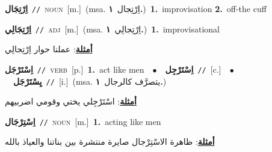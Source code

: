 \documentclass[10pt,a4paper,twoside]{article} %
\begin{document}
\begin{multicols}{2}
{\setlength\topsep{0pt}\textbf{\foreignlanguage{arabic}{اِرْتِجَال}}\ {\color{gray}\texttt{//}\color{black}}\ \textsc{noun}\ [m.]\ \color{gray}(msa. \foreignlanguage{arabic}{اِرْتِجال}~\foreignlanguage{arabic}{\textbf{١.}})\color{black}\ \textbf{1.}~improvisation  \textbf{2.}~off-the cuff\ } \vspace{2mm}

{\setlength\topsep{0pt}\textbf{\foreignlanguage{arabic}{اِرْتِجَالِي}}\ {\color{gray}\texttt{//}\color{black}}\ \textsc{adj}\ [m.]\ \color{gray}(msa. \foreignlanguage{arabic}{اِرْتِجالِي}~\foreignlanguage{arabic}{\textbf{١.}})\color{black}\ \textbf{1.}~improvisational\  \begin{flushright}\color{gray}\foreignlanguage{arabic}{\textbf{\underline{\foreignlanguage{arabic}{أمثلة}}}: عملنا حوار اِرْتِجالِي}\end{flushright}\color{black}} \vspace{2mm}

{\setlength\topsep{0pt}\textbf{\foreignlanguage{arabic}{اِسْتَرْجَل}}\ {\color{gray}\texttt{//}\color{black}}\ \textsc{verb}\ [p.]\ \textbf{1.}~act like men\ \ $\bullet$\ \ \setlength\topsep{0pt}\textbf{\foreignlanguage{arabic}{اِسْتَرْجِل}}\ {\color{gray}\texttt{//}\color{black}}\ [c.]\ \ $\bullet$\ \ \setlength\topsep{0pt}\textbf{\foreignlanguage{arabic}{يِسْتَرْجَل}}\ {\color{gray}\texttt{//}\color{black}}\ [i.]\ \color{gray}(msa. \foreignlanguage{arabic}{يتصرَّف كالرجال}~\foreignlanguage{arabic}{\textbf{١.}})\color{black}\  \begin{flushright}\color{gray}\foreignlanguage{arabic}{\textbf{\underline{\foreignlanguage{arabic}{أمثلة}}}: اسْتَرْجِلي يختي وقومي اضربيهم}\end{flushright}\color{black}} \vspace{2mm}

{\setlength\topsep{0pt}\textbf{\foreignlanguage{arabic}{اِسْتِرْجَال}}\ {\color{gray}\texttt{//}\color{black}}\ \textsc{noun}\ [m.]\ \textbf{1.}~acting like men\  \begin{flushright}\color{gray}\foreignlanguage{arabic}{\textbf{\underline{\foreignlanguage{arabic}{أمثلة}}}: ظاهرة الاسْتِرْجال صايرة منتشرة بين بناتنا والعياذ بالله}\end{flushright}\color{black}} \vspace{2mm}


\end{multicols}
\end{document}
